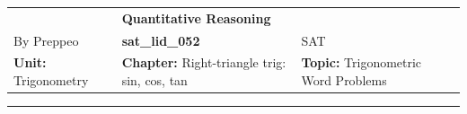 \documentclass[11pt,paper=a4,answers]{exam}
\begin{document}
\begin{center}
    \centering
    \renewcommand{\arraystretch}{1.5}
    \begin{tabularx}{\textwidth}{YYY}
    & \normalsize\bf{{\Large{{Quantitative Reasoning}}}} & \\
    By Preppeo & \normalsize\bf{{sat\_lid\_052}} & SAT\\
    \normalsize{{\textbf{{Unit:}} Trigonometry}} & \normalsize{{\textbf{{Chapter:}} Right-triangle trig: sin, cos, tan}} & \normalsize{{\textbf{{Topic:}} Trigonometric Word Problems}} \\
    \end{tabularx}
\end{center}
\par\noindent\rule{\textwidth}{1pt}
\end{document}

